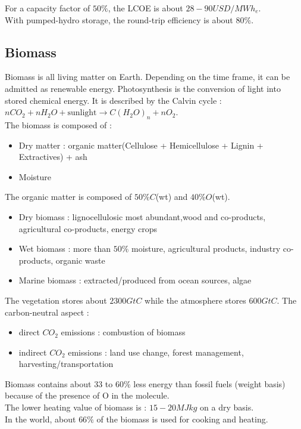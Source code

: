 \documentclass[../main.tex]{subfiles}
\begin{document}
For a capacity factor of $50\%$, the LCOE is about $28-90 USD/MWh_e$.\\

With pumped-hydro storage, the round-trip efficiency is about $80\%$.\\

\subsection{Biomass}
Biomass is all living matter on Earth. Depending on the time frame, it can be admitted as renewable energy. Photosynthesis is the conversion of light into stored chemical energy. It is described by the Calvin cycle : $n CO_2 + nH_2O + \text{sunlight} \rightarrow C(H_2O)_n + n O_2$.\\
The biomass is composed of : \begin{itemize}
    \item Dry matter : organic matter(Cellulose + Hemicellulose + Lignin + Extractives) + ash
    \item Moisture
\end{itemize}
The organic matter is composed of $50\%C$(wt) and $40\%O$(wt).
\begin{itemize}
    \item Dry biomass : lignocellulosic most abundant,wood and co-products, agricultural co-products, energy crops
    \item Wet biomass : more than $50\%$ moisture, agricultural products, industry co-products, organic waste
    \item Marine biomass : extracted/produced from ocean sources, algae
\end{itemize}

The vegetation stores about $2300 GtC$ while the atmosphere stores $600GtC$. The carbon-neutral aspect : \begin{itemize}
    \item direct $CO_2$ emissions : combustion of biomass
    \item indirect $CO_2$ emissions : land use change, forest management, harvesting/transportation
\end{itemize}

Biomass contains about $33$ to $60\%$ less energy than fossil fuels (weight basis) because of the presence of O in the molecule.\\
\warning The lower heating value of biomass is : $15-20MJkg$ on a dry basis.\\
In the world, about $66\%$ of the biomass is used for cooking and heating. \\
\end{document}
